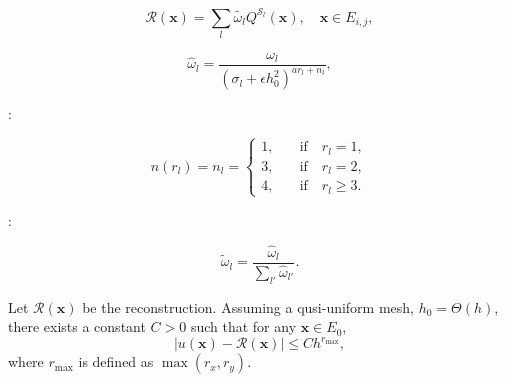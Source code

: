 \documentclass[usenames,dvipsnames,letterpaper,landscape,final]{slides}
\begin{document}
\begin{myslide}

\begin{equation}\label{eq:reconstruction}
\mathcal{R}(\mathbf{x}) = \sum_{l} \tilde{\omega_l} Q^{\mathcal{S}_l}(\mathbf{x}), \quad \mathbf{x} \in E_{i,j},
\end{equation}

\begin{equation}\label{eq:nonlinearwgts}
\hat{\omega}_l = \frac{\omega_l}{(\sigma_l + \epsilon h_0^2)^{ar_l + n_l}},
\end{equation}

:

\begin{equation}\label{eq:biasingfctor}
n(r_l) = n_l = \begin{cases}
1, \quad &\text{if} \quad r_l = 1,\\
3, \quad &\text{if} \quad r_l = 2,\\
4, \quad &\text{if} \quad r_l \geq 3.
\end{cases}
\end{equation}

:

\begin{equation}\label{eq:normalizednonlinearwgts}
\tilde{\omega}_l = \frac{\hat{\omega}_l}{\sum_{l'} \hat{\omega}_{l'}}.
\end{equation}

\end{myslide}

\begin{myslide}

\vspace{50pt}
\centering


\end{myslide}

\begin{myslide}

\vspace{50pt}

\begin{lemma}
		  Let $\mathcal{R}(\mathbf{x})$ be the reconstruction. Assuming a 
		  qusi-uniform mesh, $h_0 = \Theta(h)$, there exists a constant $C>0$
		  such that for any $\mathbf{x} \in E_0$, 
		  \begin{equation}\label{eq:errorestimate}
					 \lvert u(\mathbf{x}) - \mathcal{R}(\mathbf{x}) \rvert \leq C h^{r_{\max}},
		  \end{equation}
		  where $r_{\max}$ is defined as $\max(r_x, r_y)$.
\end{lemma}

\end{myslide}
\end{document}
